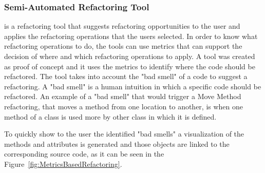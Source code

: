 




\subsubsection{Semi-Automated Refactoring Tool}
is a refactoring tool that suggests refactoring opportunities to the user and applies the refactoring operations that the users selected. 
In order to know what refactoring operations to do, the tools can use metrics that can support the decision of where and which refactoring operations to apply. 
A tool \cite{simon2001metrics} was created as proof of concept and it uses the metrics to identify where the code should be refactored.
The tool takes into account the "bad smell" of a code to suggest a refactoring. 
A "bad smell" is a human intuition in which a specific code should be refactored. 
An example of a "bad smell" that would trigger a Move Method refactoring, that moves a method from one location to another, is when one method of a class is used more by other class in which it is defined.

To quickly show to the user the identified "bad smells" a visualization of the methods and attributes is generated and those objects are linked to the corresponding source code, as it can be seen in the Figure~\ref{fig:MetricsBasedRefactoring}. 

